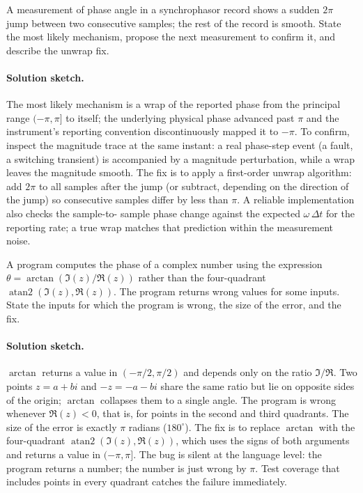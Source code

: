 \begin{exercise}
A measurement of phase angle in a synchrophasor record shows a
sudden $2\pi$ jump between two consecutive samples; the rest of
the record is smooth. State the most likely mechanism, propose
the next measurement to confirm it, and describe the unwrap
fix.

\paragraph{Solution sketch.}
The most likely mechanism is a wrap of the reported phase from
the principal range $(-\pi, \pi]$ to itself; the underlying
physical phase advanced past $\pi$ and the instrument's reporting
convention discontinuously mapped it to $-\pi$. To confirm,
inspect the magnitude trace at the same instant: a real
phase-step event (a fault, a switching transient) is accompanied
by a magnitude perturbation, while a wrap leaves the magnitude
smooth. The fix is to apply a first-order unwrap algorithm: add
$2\pi$ to all samples after the jump (or subtract, depending on
the direction of the jump) so consecutive samples differ by less
than $\pi$. A reliable implementation also checks the sample-to-
sample phase change against the expected $\omega\,\Delta t$ for
the reporting rate; a true wrap matches that prediction within
the measurement noise.
\end{exercise}

\begin{exercise}
A program computes the phase of a complex number using the
expression $\theta = \arctan(\Im(z) / \Re(z))$ rather than the
four-quadrant $\operatorname{atan2}(\Im(z), \Re(z))$. The program
returns wrong values for some inputs. State the inputs for which
the program is wrong, the size of the error, and the fix.

\paragraph{Solution sketch.}
$\arctan$ returns a value in $(-\pi/2, \pi/2)$ and depends only on
the ratio $\Im/\Re$. Two points $z = a + bi$ and $-z = -a - bi$
share the same ratio but lie on opposite sides of the origin;
$\arctan$ collapses them to a single angle. The program is wrong
whenever $\Re(z) < 0$, that is, for points in the second and
third quadrants. The size of the error is exactly $\pi$ radians
($180^{\circ}$). The fix is to replace $\arctan$ with the
four-quadrant $\operatorname{atan2}(\Im(z), \Re(z))$, which uses
the signs of both arguments and returns a value in $(-\pi, \pi]$.
The bug is silent at the language level: the program returns a
number; the number is just wrong by $\pi$. Test coverage that
includes points in every quadrant catches the failure
immediately.
\end{exercise}

